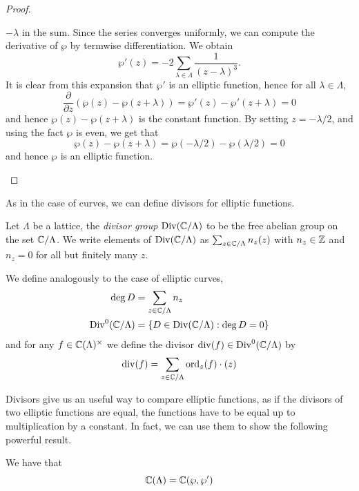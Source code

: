 \begin{proof}
\begin{enumerate}[label=(\alph*)]
		$-\lambda$ in the sum. Since the series converges uniformly,
		we can compute the derivative of $\wp$ by termwise differentiation.
		We obtain
		\begin{equation*}
			\wp'(z) = -2\sum_{\lambda \in \Lambda} \frac{1}{(z - \lambda)^3}.
		\end{equation*}
		It is clear from this expansion that $\wp'$ is an elliptic function,
		hence for all $\lambda \in \Lambda$,
		\begin{equation*}
			\frac{\partial}{\partial z}(\wp(z) - \wp(z + \lambda))
			= \wp'(z) - \wp'(z + \lambda) = 0
		\end{equation*}
		and hence $\wp(z) - \wp(z + \lambda)$ is the constant function.
		By setting $z = -\lambda/2$, and using the fact $\wp$ is even,
		we get that
		\begin{equation*}
			\wp(z) - \wp(z + \lambda) = \wp(-\lambda/2) - \wp(\lambda/2) = 0
		\end{equation*}
		and hence $\wp$ is an elliptic function.
	\end{enumerate}
\end{proof}

As in the case of curves, we can define divisors for elliptic
functions.
\begin{definition}
	Let $\Lambda$ be a lattice, the \emph{divisor group}
	$\operatorname{Div}(\mathbb{C}/\Lambda)$ to be the free abelian group on the set
	$\mathbb{C}/\Lambda$. We write elements of $\operatorname{Div}(\mathbb{C}/\Lambda)$ as
	$\sum_{z \in\mathbb{C}/\Lambda} n_z(z)$ with $n_z \in \mathbb{Z}$ and
	$n_z = 0$ for all but finitely many $z$.

	We define analogously to the case of elliptic curves,
	\begin{align*}
		\deg D &= \sum_{z \in \mathbb{C}/\Lambda} n_z\\
		\operatorname{Div}^0(\mathbb{C}/\Lambda) &= \{D \in \operatorname{Div}(\mathbb{C}/\Lambda): \deg D = 0\}
	\end{align*}
	and for any $f \in \mathbb{C}(\Lambda)^\times$ we define the divisor
	$\operatorname{div}(f) \in \operatorname{Div}^0(\mathbb{C}/\Lambda)$ by
	\begin{equation*}
		\operatorname{div}(f) = \sum_{z \in \mathbb{C}/\Lambda} \operatorname{ord}_z(f)\cdot(z)
	\end{equation*}
\end{definition}

Divisors give us an useful way to compare elliptic functions, as if
the divisors of two elliptic functions are equal, the functions have
to be equal up to multiplication by a constant.
In fact, we can use them to show the following powerful result.

\begin{theorem}
	\label{thm:wp-generates}
	We have that
	\begin{equation*}
		\mathbb{C}(\Lambda) = \mathbb{C}(\wp, \wp')
	\end{equation*}
\end{theorem}

